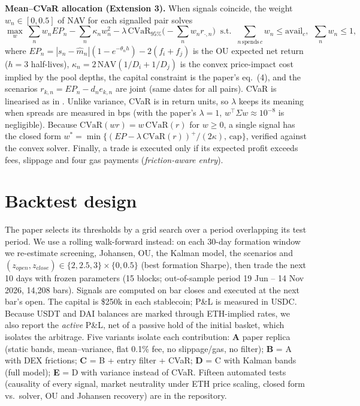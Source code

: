 \documentclass[10pt,a4paper]{article}
\begin{document}
\textbf{Mean--CVaR allocation (Extension 3).} When signals coincide, the weight $w_n\in[0,0.5]$ of NAV for each signalled pair solves
\begin{equation*}
\max_{w}\ \sum_n w_n EP_n-\sum_n\kappa_n w_n^2-\lambda\,\mathrm{CVaR}_{95\%}\Big(-\sum_n w_n r_{\cdot,n}\Big)
\ \text{ s.t. }\ \sum_{n\,\text{spends}\,c}w_n\le\mathrm{avail}_c,\ \ \sum_n w_n\le1,
\end{equation*}
where $EP_n=|s_n-\hat m_n|(1-e^{-\theta_n h})-2(f_i+f_j)$ is the OU expected net return ($h=3$ half-lives), $\kappa_n=2\,\mathrm{NAV}(1/D_i+1/D_j)$ is the convex price-impact cost implied by the pool depths, the capital constraint is the paper's eq.~(4), and the scenarios $r_{k,n}=EP_n-d_n e_{k,n}$ are joint (same dates for all pairs). CVaR is linearised as in \citet{rockafellar2000}. Unlike variance, CVaR is in return units, so $\lambda$ keeps its meaning when spreads are measured in bps (with the paper's $\lambda=1$, $w^\top\Sigma w\approx10^{-8}$ is negligible). Because $\mathrm{CVaR}(w r)=w\,\mathrm{CVaR}(r)$ for $w\ge0$, a single signal has the closed form $w^\ast=\min\{(EP-\lambda\,\mathrm{CVaR}(r))^+/(2\kappa),\,\mathrm{cap}\}$, verified against the convex solver. Finally, a trade is executed only if its expected profit exceeds fees, slippage and four gas payments (\emph{friction-aware entry}).

\section{Backtest design}
The paper selects its thresholds by a grid search over a period overlapping its test period. We use a rolling walk-forward instead: on each 30-day formation window we re-estimate screening, Johansen, OU, the Kalman model, the scenarios and $(z_{open},z_{close})\in\{2,2.5,3\}\times\{0,0.5\}$ (best formation Sharpe), then trade the next 10 days with frozen parameters (15 blocks; out-of-sample period 19 Jun -- 14 Nov 2026, 14{,}208 bars). Signals are computed on bar closes and executed at the next bar's open. The capital is \$250k in each stablecoin; P\&L is measured in USDC. Because USDT and DAI balances are marked through ETH-implied rates, we also report the \emph{active} P\&L, net of a passive hold of the initial basket, which isolates the arbitrage. Five variants isolate each contribution: \textbf{A} paper replica (static bands, mean--variance, flat 0.1\% fee, no slippage/gas, no filter); \textbf{B} = A with DEX frictions; \textbf{C} = B + entry filter + CVaR; \textbf{D} = C with Kalman bands (full model); \textbf{E} = D with variance instead of CVaR. Fifteen automated tests (causality of every signal, market neutrality under ETH price scaling, closed form vs.\ solver, OU and Johansen recovery) are in the repository.
\end{document}
